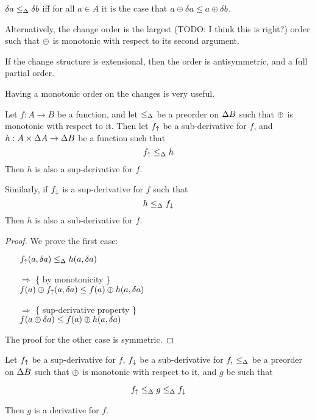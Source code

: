 \begin{defn}
  $\delta a \leq_\Delta \delta b$ iff for all $a \in A$ it is the case that $a \oplus \delta a \leq a \oplus \delta b$.
\end{defn}

Alternatively, the change order is the largest (TODO: I think this is right?) order such that $\oplus$ is monotonic with
respect to its second argument.

If the change structure is extensional, then the order is antisymmetric, and a
full partial order.

Having a monotonic order on the changes is very useful.

\begin{thm}
  Let $f: A \rightarrow B$ be a function, and let $\leq_\Delta$ be a preorder on $\Delta B$ such that $\oplus$ is monotonic with
  respect to it. Then let $f_\uparrow$ be a sub-derivative for $f$, and $h: A \times
  \Delta A \rightarrow \Delta B$ be a function such that
  $$f_\uparrow \leq_\Delta h$$
  Then $h$ is also a sup-derivative for $f$.

  Similarly, if $f_\downarrow$ is a sup-derivative for $f$ such that 
  $$h \leq_\Delta f_\downarrow$$
  Then $h$ is also a sub-derivative for $f$.
\end{thm}
\begin{proof}
  We prove the first case:
  \begin{itemize}
    \item[ ]$f_\uparrow(a, \delta a) \leq_\Delta h(a, \delta a)$
    \item[$\Rightarrow$]\{ by monotonicity \}\\
      $f(a) \oplus f_\uparrow(a, \delta a) \leq f(a) \oplus h(a, \delta a)$
    \item[$\Rightarrow$]\{ sup-derivative property \}\\
      $f(a \oplus \delta a) \leq f(a) \oplus h(a, \delta a)$
  \end{itemize}

  The proof for the other case is symmetric.
\end{proof}

\begin{thm}
  \label{thm:sandwich}
  Let $f_\uparrow$ be a sup-derivative for $f$, $f_\downarrow$ be a sub-derivative for $f$, $\leq_\Delta$ be a preorder on $\Delta B$ such that $\oplus$ is monotonic with
  respect to it, and $g$ be such that

  $$f_\uparrow \leq_\Delta g \leq_\Delta f_\downarrow$$

  Then $g$ is a derivative for $f$.
\end{thm}

